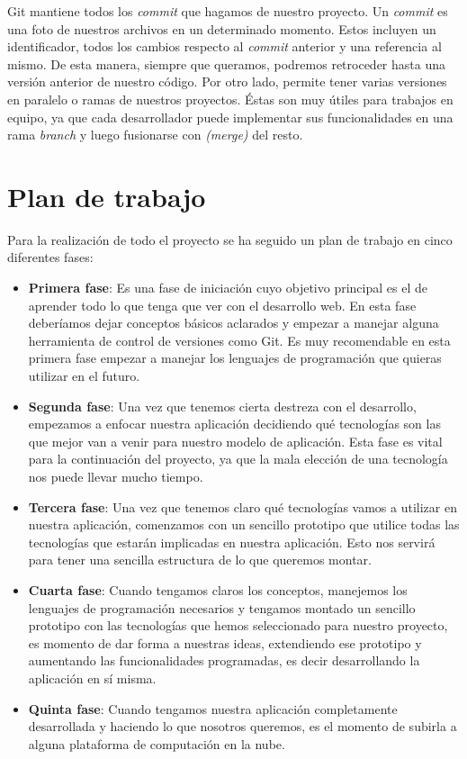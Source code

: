 Git mantiene todos los \textit{commit} que hagamos de nuestro proyecto. Un \textit{commit} es una foto de nuestros archivos en un determinado momento. Estos incluyen un identificador, todos los cambios respecto al \textit{commit} anterior y una referencia al mismo. De esta manera, siempre que queramos, podremos retroceder hasta una versión anterior de nuestro código.
Por otro lado, permite tener varias versiones en paralelo o ramas de nuestros proyectos. Éstas son muy útiles para trabajos en equipo, ya que cada desarrollador puede implementar sus funcionalidades en una rama \textit{branch} y luego fusionarse con \textit{(merge)} del resto.

\section{Plan de trabajo}

Para la realización de todo el proyecto se ha seguido un plan de trabajo en cinco diferentes fases:

\begin{itemize}

\item \textbf {Primera fase}: Es una fase de iniciación cuyo objetivo principal es el de aprender todo lo que tenga que ver con el desarrollo web. En esta fase deberíamos dejar conceptos básicos aclarados y empezar a manejar alguna herramienta de control de versiones como Git. Es muy recomendable en esta primera fase empezar a manejar los lenguajes de programación que quieras utilizar en el futuro.

\item \textbf {Segunda fase}: Una vez que tenemos cierta destreza con el desarrollo, empezamos a enfocar nuestra aplicación decidiendo qué tecnologías son las que mejor van a venir para nuestro modelo de aplicación. Esta fase es vital para la continuación del proyecto, ya que la mala elección de una tecnología nos puede llevar mucho tiempo.

\item \textbf {Tercera fase}: Una vez que tenemos claro qué tecnologías vamos a utilizar en nuestra aplicación, comenzamos con un sencillo prototipo que utilice todas las tecnologías que estarán implicadas en nuestra aplicación. Esto nos servirá para tener una sencilla estructura de lo que queremos montar.

\item \textbf {Cuarta fase}: Cuando tengamos claros los conceptos, manejemos los lenguajes de programación necesarios y tengamos montado un sencillo prototipo con las tecnologías que hemos seleccionado para nuestro proyecto, es momento de dar forma a nuestras ideas, extendiendo ese prototipo y aumentando las funcionalidades programadas, es decir desarrollando la aplicación en sí misma.

\item \textbf {Quinta fase}: Cuando tengamos nuestra aplicación completamente desarrollada y haciendo lo que nosotros queremos, es el momento de subirla a alguna plataforma de computación en la nube.
\end{itemize}
